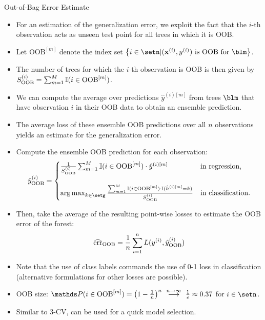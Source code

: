 \documentclass[11pt,compress,t,notes=noshow, xcolor=table]{beamer}
\begin{document}
\begin{vbframe}{Out-of-Bag Error Estimate}
\begin{itemize}
  \item For an estimation of the generalization error, we exploit the
  fact that the $i$-th observation acts as unseen test point for all trees in
  which it is OOB.
  \item Let $\text{OOB}^{[m]}$ denote the index set
  $\left \{i \in \setn | (\xv^{(i)}, \yi) \text{ is OOB for } \blm \right \}$.
  \item The number of trees for which the $i$-th observation is OOB is then
  given by $S_{\text{OOB}}^{(i)} =
  \sum_{m = 1}^M \mathbb{I}(i \in \text{OOB}^{[m]})$.
  \item We can compute the average over predictions $\hat{y}^{(i)[m]}$ from
  trees $\blm$ that have observation $i$ in their OOB data to obtain an
  ensemble prediction.
  \item The average loss of these ensemble OOB predictions over all $n$
  observations yields an estimate for the generalization error.
  \item Compute the ensemble OOB prediction for each observation:
  $$\yih_{\text{OOB}} = \begin{cases}
  \frac{1}{S_{\text{OOB}}^{(i)}} \sum_{m = 1}^{M}
  \I(i \in \text{OOB}^{[m]}) \cdot \hat{y}^{(i)[m]} & \text{in regression,}
  \\ \phantom{x} \\
  \argmax_{k \in \setg}
  \frac{\sum_{m = 1}^{M} \I(i \in \text{OOB}^{[m]}) \cdot
  \I(\hat{h}^{(i)[m]} = k)} {S_{\text{OOB}}^{(i)}} &
  \text{in classification.}
  \end{cases}$$
  \item Then, take the average of the resulting point-wise losses to estimate
  the OOB error of the forest:
  $$\widehat{\text{err}}_{\text{OOB}} = \frac{1}{n} \sum\limits_{i=1}^n L(y^{(i)}, \hat{y}^{(i)}_{\text{OOB}})$$
  \item Note that the use of class labels commands the use of 0-1 loss in
  classification (alternative formulations for other losses are possible).
  \item OOB size: $\P(i \in \text{OOB}^{[m]}) = \left(1 - \frac{1}{n}\right)^n
  \ \stackrel{n \to \infty}{\longrightarrow} \ \frac{1}{e} \approx 0.37$ for
  $i \in \setn$.
  \item Similar to 3-CV, can be used for a quick model selection.
\end{itemize}


\end{vbframe}

\endlecture
\end{document}

